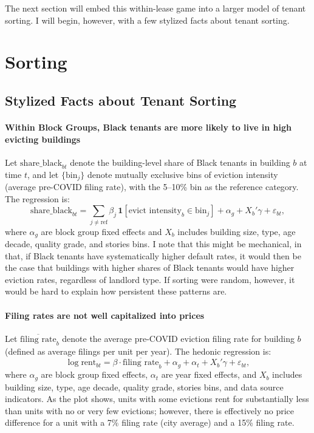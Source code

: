 \documentclass[11pt]{article}
\begin{document}
The next section will embed this within-lease game into a larger model of tenant sorting. I will begin, however, with a few stylized facts about tenant sorting. 

\clearpage
\section{Sorting}

\subsection{Stylized Facts about Tenant Sorting}
\paragraph{Within Block Groups, Black tenants are more likely to live in high evicting buildings}

Let $\text{share\_black}_{bt}$ denote the building-level share of Black tenants in building $b$ at time $t$, and let $\{\text{bin}_j\}$ denote mutually exclusive bins of eviction intensity (average pre-COVID filing rate), with the 5--10\% bin as the reference category. The regression is:
\[
\text{share\_black}_{bt}
= \sum_{j \neq \text{ref}} \beta_j \,\mathbf{1}[\text{evict intensity}_b \in \text{bin}_j]
+ \alpha_g + X_b'\gamma + \varepsilon_{bt},
\]
where $\alpha_g$ are block group fixed effects and $X_b$ includes building size, type, age decade, quality grade, and stories bins. I note that this might be mechanical, in that, if Black tenants have systematically higher default rates, it would then be the case that buildings with higher shares of Black tenants would have higher eviction rates, regardless of landlord type. If sorting were random, however, it would be hard to explain how persistent these patterns are.

\begin{table}[htbp]
\small
\caption{Tenant Racial Composition by Eviction Intensity Bin}
\label{tab:demog_eviction}
\resizebox{\textwidth}{!}{%
%
}
\end{table}
\clearpage
\paragraph{Filing rates are not well capitalized into prices}

Let $\overline{\text{filing rate}}_b$ denote the average pre-COVID eviction filing rate for building $b$ (defined as average filings per unit per year). The hedonic regression is:
\[
\log \text{rent}_{bt}
= \beta \cdot \overline{\text{filing rate}}_b
+ \alpha_g + \alpha_t + X_b'\gamma + \varepsilon_{bt},
\]
where $\alpha_g$ are block group fixed effects, $\alpha_t$ are year fixed effects, and $X_b$ includes building size, type, age decade, quality grade, stories bins, and data source indicators. As the plot shows, units with some evictions rent for substantially less than units with no or very few evictions; however, there is effectively no price difference for a unit with a 7\% filing rate (city average) and a 15\% filing rate.
\end{document}
